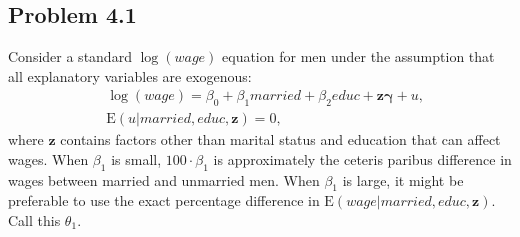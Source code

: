 \documentclass[10pt]{article}
\newcommand{\E}{\text{E}}
\begin{document}
\subsection*{Problem 4.1}
Consider a standard $\log(wage)$ equation for men under the assumption that all explanatory variables are exogenous:
\begin{align*}
    &\log(wage)=\beta_0+\beta_1 married +\beta_2 educ+\mathbf{z\pmb{\gamma}}+u, \tag{4.49} \label{h1.0}\\
    &\E(u|married,educ,\mathbf{z})=0,
\end{align*}
where $\mathbf{z}$ contains factors other than marital status and education that can affect wages. When $\beta_1$ is small, $100\cdot \beta_1$ is approximately the ceteris paribus difference in wages between married and unmarried men. When $\beta_1$ is large, it might be preferable to use the exact percentage difference in $\E(wage|married,educ,\mathbf{z})$. Call this $\theta_1$.
\end{document}

